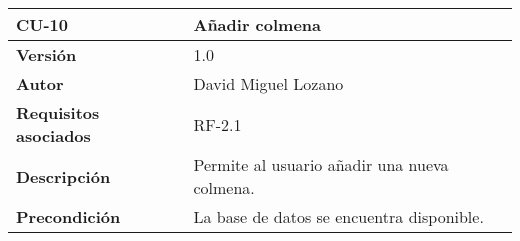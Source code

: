 \begin{longtable}[H]{@{}ll@{}}
\toprule
\begin{minipage}[b]{0.269\columnwidth}\raggedright\strut
\textbf{CU-10}\strut
\end{minipage} & \begin{minipage}[b]{0.75\columnwidth}\raggedright\strut
\textbf{Añadir colmena}\strut
\end{minipage}\tabularnewline
\midrule
\endhead
\begin{minipage}[t]{0.269\columnwidth}\raggedright\strut
\textbf{Versión}\strut
\end{minipage} & \begin{minipage}[t]{0.75\columnwidth}\raggedright\strut
1.0\strut
\end{minipage}\tabularnewline
\begin{minipage}[t]{0.269\columnwidth}\raggedright\strut
\textbf{Autor}\strut
\end{minipage} & \begin{minipage}[t]{0.75\columnwidth}\raggedright\strut
David Miguel Lozano\strut
\end{minipage}\tabularnewline
\begin{minipage}[t]{0.269\columnwidth}\raggedright\strut
\textbf{Requisitos asociados}\strut
\end{minipage} & \begin{minipage}[t]{0.75\columnwidth}\raggedright\strut
RF-2.1\strut
\end{minipage}\tabularnewline
\begin{minipage}[t]{0.269\columnwidth}\raggedright\strut
\textbf{Descripción}\strut
\end{minipage} & \begin{minipage}[t]{0.75\columnwidth}\raggedright\strut
Permite al usuario añadir una nueva colmena.\strut
\end{minipage}\tabularnewline
\begin{minipage}[t]{0.269\columnwidth}\raggedright\strut
\textbf{Precondición}\strut
\end{minipage} & \begin{minipage}[t]{0.75\columnwidth}\raggedright\strut
La base de datos se encuentra disponible.


\end{minipage}
\end{longtable}
